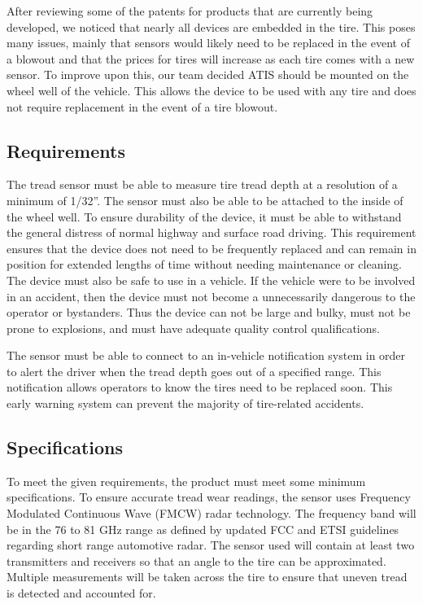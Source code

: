 \documentclass[11pt]{IEEEtran}
\begin{document}
			After reviewing some of the patents for products that are currently being developed, we noticed that nearly all devices are embedded in the tire. This poses many issues, mainly that sensors would likely need to be replaced in the event of a blowout and that the prices for tires will increase as each tire comes with a new sensor. To improve upon this, our team decided ATIS should be mounted on the wheel well of the vehicle. This allows the device to be used with any tire and does not require replacement in the event of a tire blowout.

		\subsection{Requirements}
			The tread sensor must be able to measure tire tread depth at a resolution of a minimum of 1/32''. The sensor must also be able to be attached to the inside of the wheel well. To ensure durability of the device, it must be able to withstand the general distress of normal highway and surface road driving. This requirement ensures that the device does not need to be frequently replaced and can remain in position for extended lengths of time without needing maintenance or cleaning. The device must also be safe to use in a vehicle. If the vehicle were to be involved in an accident, then the device must not become a unnecessarily dangerous to the operator or bystanders. Thus the device can not be large and bulky, must not be prone to explosions, and must have adequate quality control qualifications.

			The sensor must be able to connect to an in-vehicle notification system in order to alert the driver when the tread depth goes out of a specified range. This notification allows operators to know the tires need to be replaced soon. This early warning system can prevent the majority of tire-related accidents.
 
		\subsection{Specifications}
			To meet the given requirements, the product must meet some minimum specifications. To ensure accurate tread wear readings, the sensor uses Frequency Modulated Continuous Wave (FMCW) radar technology. The frequency band will be in the 76 to 81 GHz range as defined by updated FCC and ETSI guidelines regarding short range automotive radar. The sensor used will contain at least two transmitters and receivers so that an angle to the tire can be approximated. Multiple measurements will be taken across the tire to ensure that uneven tread is detected and accounted for. 
\end{document}
